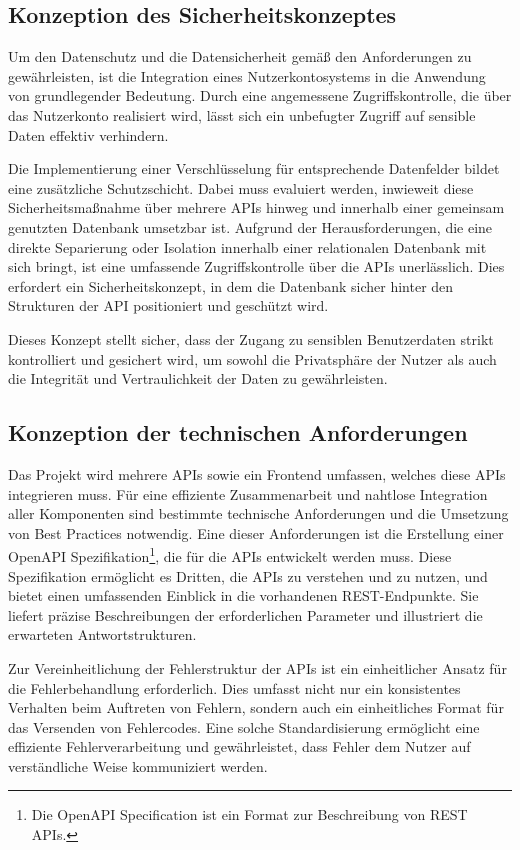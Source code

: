 \subsection{Konzeption des Sicherheitskonzeptes}
Um den Datenschutz und die Datensicherheit gemäß den Anforderungen zu gewährleisten, ist die Integration eines Nutzerkontosystems in die Anwendung von grundlegender Bedeutung. Durch eine angemessene Zugriffskontrolle, die über das Nutzerkonto realisiert wird, lässt sich ein unbefugter Zugriff auf sensible Daten effektiv verhindern. 

Die Implementierung einer Verschlüsselung für entsprechende Datenfelder bildet eine zusätzliche Schutzschicht. Dabei muss evaluiert werden, inwieweit diese Sicherheitsmaßnahme über mehrere \ac{API}s hinweg und innerhalb einer gemeinsam genutzten Datenbank umsetzbar ist. Aufgrund der Herausforderungen, die eine direkte Separierung oder Isolation innerhalb einer relationalen Datenbank mit sich bringt, ist eine umfassende Zugriffskontrolle über die APIs unerlässlich. Dies erfordert ein Sicherheitskonzept, in dem die Datenbank sicher hinter den Strukturen der API positioniert und geschützt wird.

Dieses Konzept stellt sicher, dass der Zugang zu sensiblen Benutzerdaten strikt kontrolliert und gesichert wird, um sowohl die Privatsphäre der Nutzer als auch die Integrität und Vertraulichkeit der Daten zu gewährleisten.


\subsection{Konzeption der technischen Anforderungen}
Das Projekt wird mehrere APIs sowie ein Frontend umfassen, welches diese APIs integrieren muss. Für eine effiziente Zusammenarbeit und nahtlose Integration aller Komponenten sind bestimmte technische Anforderungen 
und die Umsetzung von Best Practices notwendig. Eine dieser Anforderungen ist die Erstellung einer OpenAPI Spezifikation\footnote{Die OpenAPI Specification ist ein Format zur Beschreibung von REST APIs.}, 
die für die APIs entwickelt werden muss. Diese Spezifikation ermöglicht es Dritten, die APIs zu verstehen und zu nutzen, und bietet einen umfassenden Einblick in die vorhandenen REST-Endpunkte. 
Sie liefert präzise Beschreibungen der erforderlichen Parameter und illustriert die erwarteten Antwortstrukturen.

Zur Vereinheitlichung der Fehlerstruktur der APIs ist ein einheitlicher Ansatz für die Fehlerbehandlung erforderlich. Dies umfasst nicht nur ein konsistentes Verhalten beim Auftreten von Fehlern, 
sondern auch ein einheitliches Format für das Versenden von Fehlercodes. Eine solche Standardisierung ermöglicht eine effiziente Fehlerverarbeitung und gewährleistet, dass Fehler dem Nutzer auf verständliche Weise kommuniziert werden.

